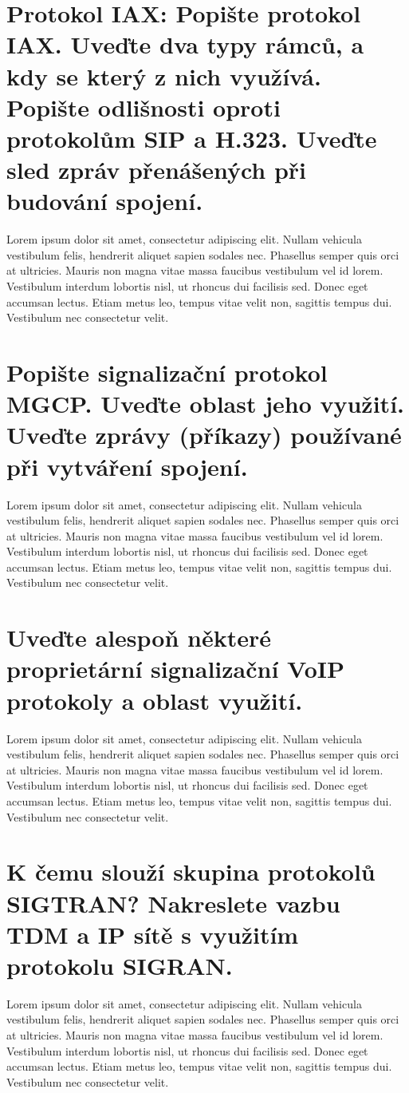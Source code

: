 \section{Protokol IAX: Popište protokol IAX. Uveďte dva typy rámců, a kdy se který z nich využívá. Popište odlišnosti oproti protokolům SIP a H.323. Uveďte sled zpráv přenášených při budování spojení.}
Lorem ipsum dolor sit amet, consectetur adipiscing elit. Nullam vehicula vestibulum felis, hendrerit aliquet sapien sodales nec. Phasellus semper quis orci at ultricies. Mauris non magna vitae massa faucibus vestibulum vel id lorem. Vestibulum interdum lobortis nisl, ut rhoncus dui facilisis sed. Donec eget accumsan lectus. Etiam metus leo, tempus vitae velit non, sagittis tempus dui. Vestibulum nec consectetur velit.

\section{Popište signalizační protokol MGCP. Uveďte oblast jeho využití. Uveďte zprávy (příkazy) používané při vytváření spojení.}
Lorem ipsum dolor sit amet, consectetur adipiscing elit. Nullam vehicula vestibulum felis, hendrerit aliquet sapien sodales nec. Phasellus semper quis orci at ultricies. Mauris non magna vitae massa faucibus vestibulum vel id lorem. Vestibulum interdum lobortis nisl, ut rhoncus dui facilisis sed. Donec eget accumsan lectus. Etiam metus leo, tempus vitae velit non, sagittis tempus dui. Vestibulum nec consectetur velit.

\section{Uveďte alespoň některé proprietární signalizační VoIP protokoly a oblast využití.}
Lorem ipsum dolor sit amet, consectetur adipiscing elit. Nullam vehicula vestibulum felis, hendrerit aliquet sapien sodales nec. Phasellus semper quis orci at ultricies. Mauris non magna vitae massa faucibus vestibulum vel id lorem. Vestibulum interdum lobortis nisl, ut rhoncus dui facilisis sed. Donec eget accumsan lectus. Etiam metus leo, tempus vitae velit non, sagittis tempus dui. Vestibulum nec consectetur velit.

\section{K čemu slouží skupina protokolů SIGTRAN? Nakreslete vazbu TDM a IP sítě s využitím protokolu SIGRAN.}
Lorem ipsum dolor sit amet, consectetur adipiscing elit. Nullam vehicula vestibulum felis, hendrerit aliquet sapien sodales nec. Phasellus semper quis orci at ultricies. Mauris non magna vitae massa faucibus vestibulum vel id lorem. Vestibulum interdum lobortis nisl, ut rhoncus dui facilisis sed. Donec eget accumsan lectus. Etiam metus leo, tempus vitae velit non, sagittis tempus dui. Vestibulum nec consectetur velit.

